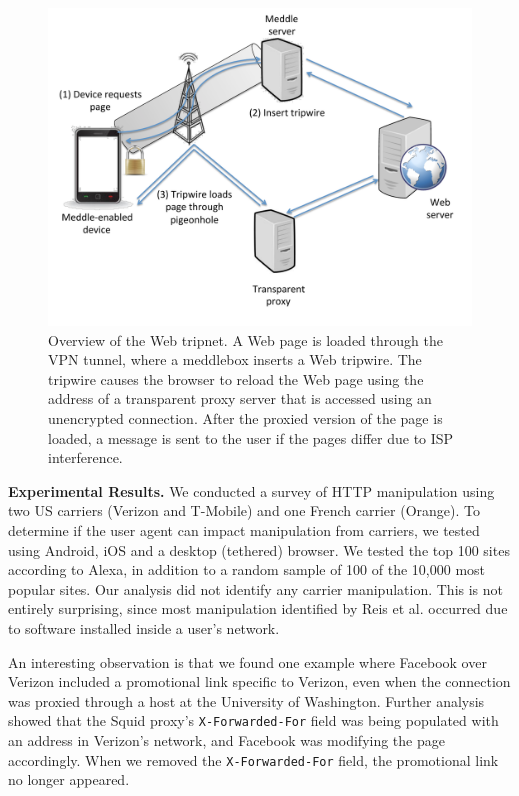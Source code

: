 \begin{figure}
\centering
        \includegraphics[width=\linewidth]{figs/tripnet.pdf}
\vspace{-2em}
  \caption{Overview of the \meddle Web tripnet. A Web page is loaded 
through the VPN tunnel, where a meddlebox inserts a Web tripwire. The 
tripwire causes the browser to reload the Web page using the address of a
transparent proxy server that is accessed using an unencrypted connection. 
After the proxied version of the page is loaded, a message is sent to the user if 
the pages differ due to ISP interference. }
  \label{fig:tripnet}
\vspace{\postfigspace}
\end{figure}

\noindent\textbf{Experimental Results.} We conducted a survey of HTTP manipulation using two US carriers (Verizon and T-Mobile) 
and one French carrier (Orange). To determine if the user agent can impact manipulation from 
carriers, we tested using Android, iOS and a desktop (tethered) browser. We tested the top 
100 sites according to Alexa, in addition to a random sample of 100 of the 10,000 most popular 
sites. Our analysis did not identify any carrier manipulation. This is not entirely surprising, 
since most manipulation identified by Reis et al. occurred due to software installed inside 
a user's network.

An interesting observation is that 
we found one example where Facebook over Verizon included a promotional link specific to 
Verizon, even when the connection was proxied through a host at the University of Washington. 
Further analysis showed that the Squid proxy's {\tt X-Forwarded-For} field was being populated 
with an address in Verizon's network, and Facebook was modifying the page accordingly. When 
we removed the {\tt X-Forwarded-For} field, the promotional link no longer appeared. 

